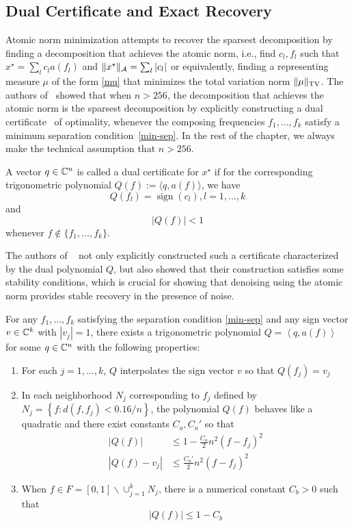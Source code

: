 \subsection{Dual Certificate and Exact Recovery}

Atomic norm minimization attempts to recover the sparsest decomposition by
finding a decomposition that achieves the atomic norm, i.e., find ${c_l,f_l}$
such that $x^\star = \sum_l c_l a(f_l)$ and $ \lVert x^\star\rVert_{\mathcal{A}} = \sum_l |c_l|
$ or equivalently, finding a representing measure $\mu$ of the form \eqref{mu}
that minimizes the total variation norm $ \lVert\mu\rVert_{\mathrm{TV}}$. The
authors of~\cite{cg_exact12} showed that when $n > 256$, the decomposition that
achieves the atomic norm is the sparsest decomposition by explicitly
constructing a dual certificate~\cite{dualcert} of optimality, whenever the
composing frequencies $f_1, \ldots, f_k$ satisfy a minimum separation
condition~\eqref{min-sep}. In the rest of the chapter, we always make the
technical assumption that $n > 256$.

\begin{definition}
\label{dual-cert}
A vector $q \in \mathbb{C}^n$ is called a dual certificate for $x^\star$ if for the corresponding trigonometric polynomial $Q(f) := \langle q, a(f) \rangle$, we have
$$Q(f_l) = \operatorname{sign}(c_l), l = 1, \ldots, k$$  and $$|Q(f)| < 1$$ whenever $f\not\in \{ f_1, \ldots, f_k\}$.
\end{definition}
The authors of ~\cite{cg_exact12} not only explicitly constructed 
such a certificate characterized by the dual polynomial $Q$, but also showed that their construction satisfies some stability conditions, which is crucial for showing that denoising using the atomic norm provides stable recovery in the presence of noise.

\begin{theorem}
\label{dual-stab} For any $f_1, \ldots, f_k$ satisfying the separation condition \eqref{min-sep} and any sign vector $v \in \mathbb{C}^k$ with $|v_j|=1$, there exists a trigonometric polynomial $Q = \left<q, a(f)\right>$ for some $q \in \mathbb{C}^n$ with the following properties: 
\begin{enumerate}
\item For each $j = 1, \ldots, k$, $Q$ interpolates the sign vector $v$ so that $Q(f_j) = v_j$
\item In each neighborhood $N_j$ corresponding to $f_j$ defined by
$N_j = \left\{ f : d(f, f_j) < {0.16}/{n} \right\}$, 
the polynomial $Q(f)$ behaves like a quadratic and there exist constants $C_a, C_a'$ so that
\begin{align}
\label{q1}|Q(f)| & \leq 1 - \frac{C_a}{2} n^2 (f-f_j)^2\\
\label{q2}|Q(f) - v_j| & \leq \frac{C_a'}{2} n^2 (f - f_j)^2
\end{align}
\item When $f \in F = [0,1] \backslash \cup_{j=1}^k{N_j}$, there is a numerical constant $C_b>0$ such that
\[
|Q(f)| \leq 1 - C_b
\]
\end{enumerate}
\end{theorem}

